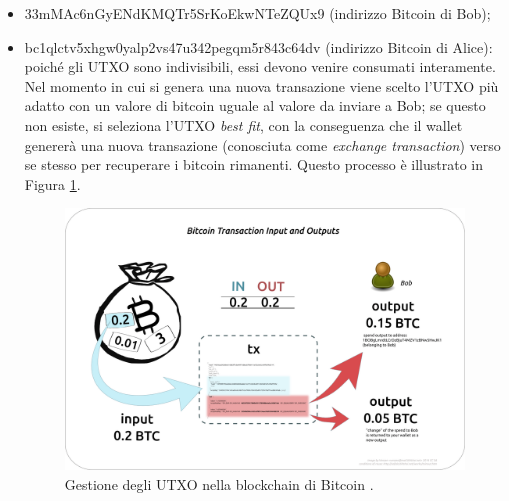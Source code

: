 \begin{example}
\begin{itemize}
  \item 33mMAc6nGyENdKMQTr5SrKoEkwNTeZQUx9 (indirizzo Bitcoin di Bob);

  \item bc1qlctv5xhgw0yalp2vs47u342pegqm5r843c64dv (indirizzo Bitcoin di Alice): poiché gli UTXO sono indivisibili, essi devono venire consumati interamente.  Nel momento in cui si genera una nuova transazione viene scelto l’UTXO più adatto con un valore di bitcoin uguale al valore da inviare a Bob; se questo non esiste, si seleziona l'UTXO \emph{best fit},  con la conseguenza che il wallet genererà una nuova transazione (conosciuta come \emph{exchange transaction}) verso se stesso per recuperare i bitcoin rimanenti. Questo processo è illustrato in Figura \ref{fig:examplechangeutxo}.



  \begin{figure}[h]
  \begin{center}
  \includegraphics[width=0.6\columnwidth]{images/change_utxo.png}
  \end{center}
  \caption{Gestione degli UTXO nella blockchain di Bitcoin \cite{blockstream:esplora}.}
  \label{fig:examplechangeutxo}
  \end{figure}
\end{itemize}


\end{example}
